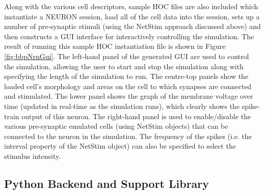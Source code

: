 Along with the various cell descriptors, sample HOC files are also included which instantiate a NEURON session, load all of the cell data into the session, sets up a number of pre-synaptic stimuli (using the NetStim approach discussed above) and then constructs a GUI interface for interactively controlling the simulation. The result of running this sample HOC instantiation file is shown in Figure \ref{fig:bbpNrnGui}. The left-hand panel of the generated GUI are used to control the simulation, allowing the user to start and stop the simulation along with specifying the length of the simulation to run. The centre-top panels show the loaded cell's morphology and areas on the cell to which synapses are connected and stimulated. The lower panel shows the graph of the membrane voltage over time (updated in real-time as the simulation runs), which clearly shows the spike-train output of this neuron. The right-hand panel is used to enable/disable the various pre-synaptic emulated cells (using NetStim objects) that can be connected to the neuron in the simulation. The frequency of the spikes (i.e. the interval property of the NetStim object) can also be specified to select the stimulus intensity.



\subsection{Python Backend and Support Library}

